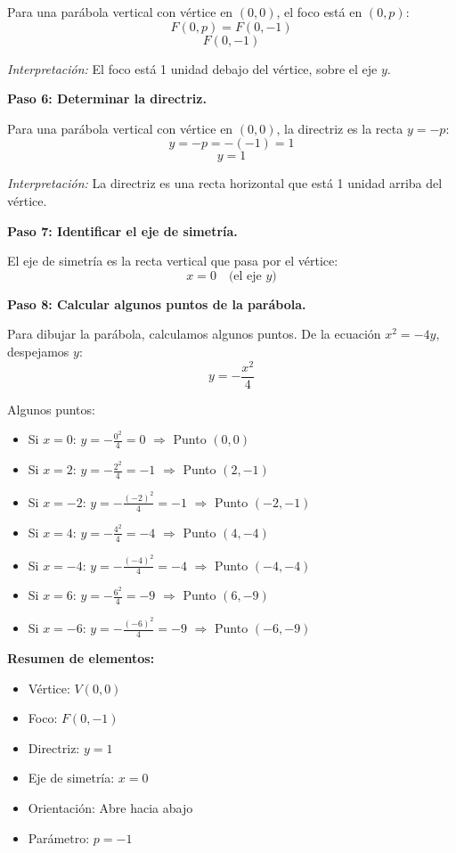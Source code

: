 \documentclass[12pt,a4paper]{article}
\begin{document}
	Para una parábola vertical con vértice en \((0,0)\), el foco está en \((0,p)\):
	\[
	F(0,p)=F(0,-1)
	\]
	\[
	\boxed{F(0,-1)}
	\]

	\emph{Interpretación:} El foco está 1 unidad debajo del vértice, sobre el eje \(y\).

	\bigskip

	\textbf{Paso 6: Determinar la directriz.}

	Para una parábola vertical con vértice en \((0,0)\), la directriz es la recta \(y=-p\):
	\[
	y=-p=-(-1)=1
	\]
	\[
	\boxed{y=1}
	\]

	\emph{Interpretación:} La directriz es una recta horizontal que está 1 unidad arriba del vértice.

	\bigskip

	\textbf{Paso 7: Identificar el eje de simetría.}

	El eje de simetría es la recta vertical que pasa por el vértice:
	\[
	x=0 \quad\text{(el eje \(y\))}
	\]

	\bigskip

	\textbf{Paso 8: Calcular algunos puntos de la parábola.}

	Para dibujar la parábola, calculamos algunos puntos. De la ecuación \(x^2=-4y\), despejamos \(y\):
	\[
	y=-\frac{x^2}{4}
	\]

	Algunos puntos:
	\begin{itemize}
		\item Si \(x=0\): \(y=-\frac{0^2}{4}=0\) \(\Rightarrow\) Punto \((0,0)\)
		\item Si \(x=2\): \(y=-\frac{2^2}{4}=-1\) \(\Rightarrow\) Punto \((2,-1)\)
		\item Si \(x=-2\): \(y=-\frac{(-2)^2}{4}=-1\) \(\Rightarrow\) Punto \((-2,-1)\)
		\item Si \(x=4\): \(y=-\frac{4^2}{4}=-4\) \(\Rightarrow\) Punto \((4,-4)\)
		\item Si \(x=-4\): \(y=-\frac{(-4)^2}{4}=-4\) \(\Rightarrow\) Punto \((-4,-4)\)
		\item Si \(x=6\): \(y=-\frac{6^2}{4}=-9\) \(\Rightarrow\) Punto \((6,-9)\)
		\item Si \(x=-6\): \(y=-\frac{(-6)^2}{4}=-9\) \(\Rightarrow\) Punto \((-6,-9)\)
	\end{itemize}

	\bigskip

	\textbf{Resumen de elementos:}
	\begin{itemize}
		\item Vértice: \(V(0,0)\)
		\item Foco: \(F(0,-1)\)
		\item Directriz: \(y=1\)
		\item Eje de simetría: \(x=0\)
		\item Orientación: Abre hacia abajo
		\item Parámetro: \(p=-1\)
	\end{itemize}
\end{document}
